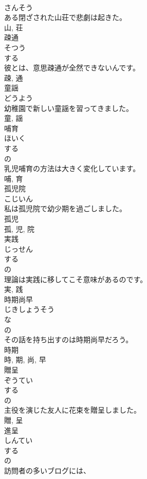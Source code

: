 \documentclass[8pt]{extreport}
\begin{document}
\begin{CJK}{UTF8}{min}
\\	さんそう	
\\	ある閉ざされた山荘で悲劇は起きた。	
\\	山, 荘	
\\	疎通	
\\	そつう	
\\	する 
\\	彼とは、意思疎通が全然できないんです。	
\\	疎, 通	
\\	童謡	
\\	どうよう	
\\	幼稚園で新しい童謡を習ってきました。	
\\	童, 謡	
\\	哺育	
\\	ほいく	
\\	する 
\\	の 
\\	乳児哺育の方法は大きく変化しています。	
\\	哺, 育	
\\	孤児院	
\\	こじいん	
\\	私は孤児院で幼少期を過ごしました。	
\\	孤児 
\\	孤, 児, 院	
\\	実践	
\\	じっせん	
\\	する 
\\	の 
\\	理論は実践に移してこそ意味があるのです。	
\\	実, 践	
\\	時期尚早	
\\	じきしょうそう	
\\	な 
\\	の 
\\	その話を持ち出すのは時期尚早だろう。	
\\	時期 
\\	時, 期, 尚, 早	
\\	贈呈	
\\	ぞうてい	
\\	する 
\\	の 
\\	主役を演じた友人に花束を贈呈しました。	
\\	贈, 呈	
\\	進呈	
\\	しんてい	
\\	する 
\\	の 
\\	訪問者の多いブログには、

\end{CJK}
\end{document}
